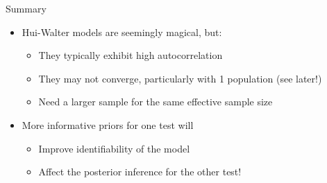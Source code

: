 \documentclass[
  ignorenonframetext,
  aspectratio=169,
]{beamer}
\providecommand{\tightlist}{%
  \setlength{\itemsep}{0pt}\setlength{\parskip}{0pt}}
\begin{document}
\begin{frame}[fragile]{Summary}
\protect\hypertarget{summary}{}
\begin{itemize}
\tightlist
\item
  Hui-Walter models are seemingly magical, but:

  \begin{itemize}
  \tightlist
  \item
    They typically exhibit high autocorrelation
  \item
    They may not converge, particularly with 1 population (see later!)
  \item
    Need a larger sample for the same effective sample size
  \end{itemize}
\item
  More informative priors for one test will

  \begin{itemize}
  \tightlist
  \item
    Improve identifiability of the model
  \item
    Affect the posterior inference for the other test!
  \end{itemize}
\end{itemize}
\end{frame}
\end{document}
